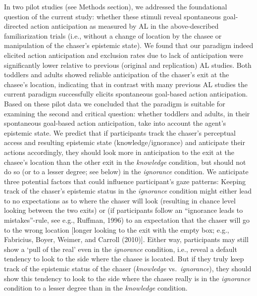 \documentclass[
  man,floatsintext]{apa6}
\begin{document}
In two pilot studies (see Methods section), we addressed the foundational question of the current study: whether these stimuli reveal spontaneous goal-directed action anticipation as measured by AL in the above-described familiarization trials (i.e., without a change of location by the chasee or manipulation of the chaser's epistemic state). We found that our paradigm indeed elicited action anticipation and exclusion rates due to lack of anticipation were significantly lower relative to previous (original and replication) AL studies. Both toddlers and adults showed reliable anticipation of the chaser's exit at the chasee's location, indicating that in contrast with many previous AL studies the current paradigm successfully elicits spontaneous goal-based action anticipation. Based on these pilot data we concluded that the paradigm is suitable for examining the second and critical question: whether toddlers and adults, in their spontaneous goal-based action anticipation, take into account the agent's epistemic state.
We predict that if participants track the chaser's perceptual access and resulting epistemic state (knowledge/ignorance) and anticipate their actions accordingly, they should look more in anticipation to the exit at the chasee's location than the other exit in the \emph{knowledge} condition, but should not do so (or to a lesser degree; see below) in the \emph{ignorance} condition. We anticipate three potential factors that could influence participant's gaze patterns: Keeping track of the chaser's epistemic status in the \emph{ignorance} condition might either lead to no expectations as to where the chaser will look (resulting in chance level looking between the two exits) or (if participants follow an ``ignorance leads to mistakes''-rule, see e.g., Ruffman, 1996) to an expectation that the chaser will go to the wrong location {[}longer looking to the exit with the empty box; e.g., Fabricius, Boyer, Weimer, and Carroll (2010){]}. Either way, participants may still show a `pull of the real' even in the \emph{ignorance} condition, i.e., reveal a default tendency to look to the side where the chasee is located. But if they truly keep track of the epistemic status of the chaser (\emph{knowledge} vs.~\emph{ignorance}), they should show this tendency to look to the side where the chasee really is in the \emph{ignorance} condition to a lesser degree than in the \emph{knowledge} condition.
\end{document}
